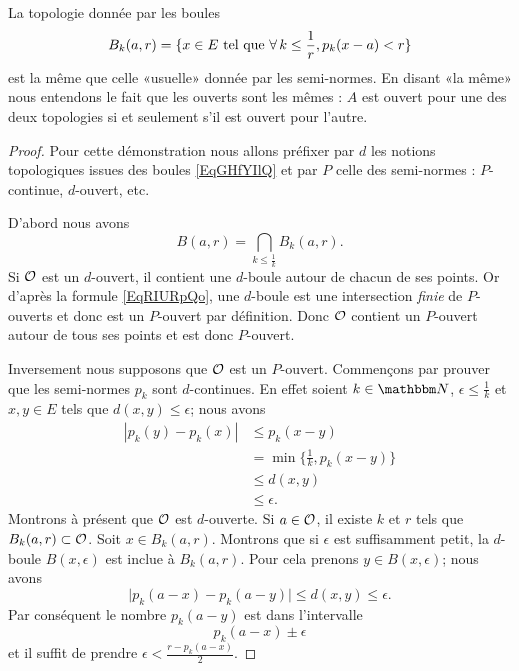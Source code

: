 \begin{proposition} \label{PropLOwUvCO}
    La topologie donnée par les boules
    \begin{equation}    \label{EqGHfYIlQ}
        B_k(a,r)=\{ x\in E\text{ tel que } \forall\,k\leq \frac{1}{ r },p_k(x-a)<r\}
    \end{equation}
    est la même que celle «usuelle» donnée par les semi-normes. En disant «la même» nous entendons le fait que les ouverts sont les mêmes : \( A\) est ouvert pour une des deux topologies si et seulement s'il est ouvert pour l'autre.
\end{proposition}

\begin{proof}
    Pour cette démonstration nous allons préfixer par \( d\) les notions topologiques issues des boules \eqref{EqGHfYIlQ} et par \( P\) celle des semi-normes : \( P\)-continue, \( d\)-ouvert, etc.

    D'abord nous avons
    \begin{equation}    \label{EqRIURpQo}
        B(a,r)=\bigcap_{k\leq \frac{1}{ k }}B_k(a,r).
    \end{equation}
    Si \( \mathcal{O}\) est un \( d\)-ouvert, il contient une \( d\)-boule autour de chacun de ses points. Or d'après la formule \eqref{EqRIURpQo}, une \( d\)-boule est une intersection \emph{finie} de \( P\)-ouverts et donc est un \( P\)-ouvert par définition. Donc \( \mathcal{O}\) contient un \( P\)-ouvert autour de tous ses points et est donc \( P\)-ouvert.

    Inversement nous supposons que \( \mathcal{O}\) est un \( P\)-ouvert. Commençons par prouver que les semi-normes \( p_k\) sont \( d\)-continues. En effet soient \( k\in \eN\), \( \epsilon\leq \frac{1}{ k }\) et \( x,y\in E\) tels que \( d(x,y)\leq \epsilon\); nous avons
    \begin{subequations}
        \begin{align}
            | p_k(y)-p_k(x) |&\leq p_k(x-y)\\
            &=\min\{ \frac{1}{ k },p_k(x-y) \}\\
            &\leq d(x,y)\\
            &\leq \epsilon.
        \end{align}
    \end{subequations}
    Montrons à présent que \( \mathcal{O}\) est \( d\)-ouverte. Si \( a\in\mathcal{O}\), il existe \( k\) et \( r\) tels que \( B_k(a,r)\subset\mathcal{O}\). Soit \( x\in B_k(a,r)\). Montrons que si \( \epsilon\) est suffisamment petit, la \( d\)-boule \( B(x,\epsilon)\) est inclue à \( B_k(a,r)\). Pour cela prenons \( y\in B(x,\epsilon)\); nous avons
    \begin{equation}
        \big| p_k(a-x)-p_k(a-y) \big|\leq d(x,y)\leq \epsilon.
    \end{equation}
    Par conséquent le nombre \( p_k(a-y)\) est dans l'intervalle
    \begin{equation}
        p_k(a-x)\pm\epsilon
    \end{equation}
    et il suffit de prendre \( \epsilon<\frac{ r-p_k(a-x) }{2}\).
\end{proof}

